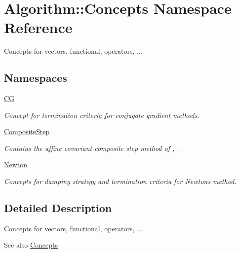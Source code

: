 \hypertarget{namespaceAlgorithm_1_1Concepts}{}\section{Algorithm\+:\+:Concepts Namespace Reference}
\label{namespaceAlgorithm_1_1Concepts}


Concepts for vectors, functional, operators, ...  


\subsection*{Namespaces}
\begin{DoxyCompactItemize}
\item 
 \hyperlink{namespaceAlgorithm_1_1Concepts_1_1CG}{C\+G}
\begin{DoxyCompactList}\small\item\em Concept for termination criteria for conjugate gradient methods. \end{DoxyCompactList}\item 
 \hyperlink{namespaceAlgorithm_1_1Concepts_1_1CompositeStep}{Composite\+Step}
\begin{DoxyCompactList}\small\item\em Contains the affine covariant composite step method of \cite{Lubkoll2015}, \cite{Lubkoll2015a}. \end{DoxyCompactList}\item 
 \hyperlink{namespaceAlgorithm_1_1Concepts_1_1Newton}{Newton}
\begin{DoxyCompactList}\small\item\em Concepts for damping strategy and termination criteria for Newton\textquotesingle{}s method. \end{DoxyCompactList}\end{DoxyCompactItemize}


\subsection{Detailed Description}
Concepts for vectors, functional, operators, ... 

\begin{DoxySeeAlso}{See also}
\hyperlink{group__ConceptGroup}{Concepts} 
\end{DoxySeeAlso}
